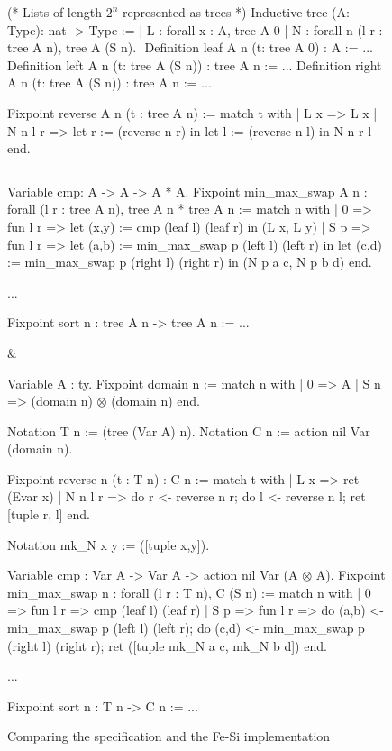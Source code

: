 \documentclass{llncs}
\begin{document}
\begin{figure}[t]
  \centering
\begin{twolistings}
\begin{coq}
(* Lists of length $2^n$ represented as trees *)
Inductive tree (A: Type): nat -> Type :=
| L : forall x : A, tree A 0
| N : forall n (l r : tree A n), tree A (S n). 
$ $
Definition leaf  {A n} (t: tree A 0) : A := ...
Definition left  {A n} (t: tree A (S n)) : tree A n := ...
Definition right {A n} (t: tree A (S n)) : tree A n := ...

Fixpoint reverse {A} n (t : tree A n) :=
match t with 
| L x => L x
| N n l r => 
  let r := (reverse n r) in 
  let l := (reverse n l) in 
  N n r l
end.

$ $

Variable cmp: A -> A -> A * A.
Fixpoint min_max_swap {A} n : 
  forall (l r : tree A n), tree A n * tree A n :=
match n with 
| 0 => fun l r => 
  let (x,y) := cmp (leaf l) (leaf r) in (L x, L y)
| S p => fun l r => 
  let (a,b) := min_max_swap p (left l) (left r) in 
  let (c,d) := min_max_swap p (right l) (right r) in 
  (N p a c, N p b d)
end. 

...

Fixpoint sort n : tree A n -> tree A n := ...
\end{coq}
& $\quad$
\begin{coq}
Variable A : ty.        
Fixpoint domain n := match n with 
| 0 => A
| S n => (domain n) $\otimes$ (domain n)
end. 

Notation T n := (tree (Var A) n). 
Notation C n := action nil Var (domain n). 

Fixpoint reverse n (t : T n) : C n  :=
match t with 
| L x => ret (Evar x)
| N n l r => 
  do r <- reverse n r;
  do l <- reverse n l;
  ret [tuple r, l]
end.

Notation mk_N x y := ([tuple x,y]).

Variable cmp : Var A -> Var A -> action nil Var (A $\otimes$ A).
Fixpoint min_max_swap n : 
  forall (l r : T n), C (S n) :=
match n  with 
| 0 => fun l r => 
  cmp (leaf l) (leaf r)
| S p => fun l r => 
  do (a,b) <- min_max_swap p (left l) (left r);
  do (c,d) <- min_max_swap p (right l) (right r); 
  ret ([tuple mk_N a c, mk_N b d])
end.

...

Fixpoint sort n : T n -> C n := ...
\end{coq}
\end{twolistings}
  
  \caption{Comparing the specification and the Fe-Si implementation}
  \label{fig:reverse}
\end{figure}
\end{document}

